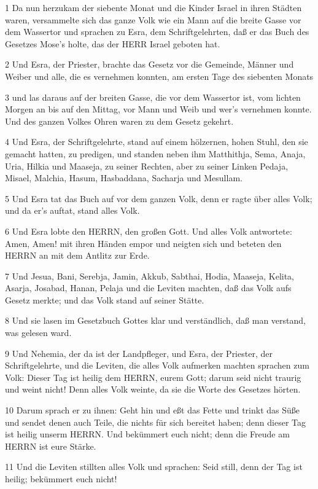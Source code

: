 \par 1 Da nun herzukam der siebente Monat und die Kinder Israel in ihren Städten waren, versammelte sich das ganze Volk wie ein Mann auf die breite Gasse vor dem Wassertor und sprachen zu Esra, dem Schriftgelehrten, daß er das Buch des Gesetzes Mose's holte, das der HERR Israel geboten hat.
\par 2 Und Esra, der Priester, brachte das Gesetz vor die Gemeinde, Männer und Weiber und alle, die es vernehmen konnten, am ersten Tage des siebenten Monats
\par 3 und las daraus auf der breiten Gasse, die vor dem Wassertor ist, vom lichten Morgen an bis auf den Mittag, vor Mann und Weib und wer's vernehmen konnte. Und des ganzen Volkes Ohren waren zu dem Gesetz gekehrt.
\par 4 Und Esra, der Schriftgelehrte, stand auf einem hölzernen, hohen Stuhl, den sie gemacht hatten, zu predigen, und standen neben ihm Matthithja, Sema, Anaja, Uria, Hilkia und Maaseja, zu seiner Rechten, aber zu seiner Linken Pedaja, Misael, Malchia, Hasum, Hasbaddana, Sacharja und Mesullam.
\par 5 Und Esra tat das Buch auf vor dem ganzen Volk, denn er ragte über alles Volk; und da er's auftat, stand alles Volk.
\par 6 Und Esra lobte den HERRN, den großen Gott. Und alles Volk antwortete: Amen, Amen! mit ihren Händen empor und neigten sich und beteten den HERRN an mit dem Antlitz zur Erde.
\par 7 Und Jesua, Bani, Serebja, Jamin, Akkub, Sabthai, Hodia, Maaseja, Kelita, Asarja, Josabad, Hanan, Pelaja und die Leviten machten, daß das Volk aufs Gesetz merkte; und das Volk stand auf seiner Stätte.
\par 8 Und sie lasen im Gesetzbuch Gottes klar und verständlich, daß man verstand, was gelesen ward.
\par 9 Und Nehemia, der da ist der Landpfleger, und Esra, der Priester, der Schriftgelehrte, und die Leviten, die alles Volk aufmerken machten sprachen zum Volk: Dieser Tag ist heilig dem HERRN, eurem Gott; darum seid nicht traurig und weint nicht! Denn alles Volk weinte, da sie die Worte des Gesetzes hörten.
\par 10 Darum sprach er zu ihnen: Geht hin und eßt das Fette und trinkt das Süße und sendet denen auch Teile, die nichts für sich bereitet haben; denn dieser Tag ist heilig unserm HERRN. Und bekümmert euch nicht; denn die Freude am HERRN ist eure Stärke.
\par 11 Und die Leviten stillten alles Volk und sprachen: Seid still, denn der Tag ist heilig; bekümmert euch nicht!
